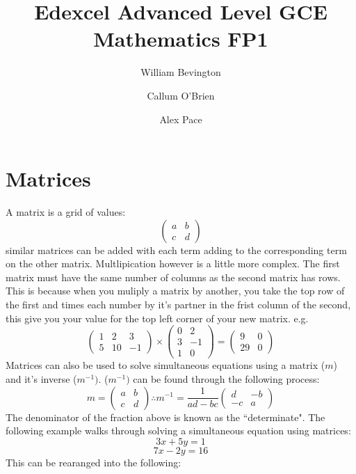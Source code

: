 \documentclass{article}
\title{Edexcel Advanced Level GCE Mathematics FP1}
\author{William Bevington \and Callum O'Brien \and Alex Pace}
\date{}
\begin{document}
\maketitle
\tableofcontents
\newpage

\section{Matrices}
                A matrix is a grid of values:
                \[\left(\begin{array}{cc} a & b \\ c & d \end{array}\right)\]
                similar matrices can be added with each term adding to the corresponding term on the other matrix. Multlipication however is a little more complex. The first matrix must have the same number of columns as the second matrix has rows. This is because when you muliply a matrix by another, you take the top row of the first and times each number by it's partner in the frist column of the second, this give you your value for the top left corner of your new matrix. e.g.
                \[\left(\begin{array}{ccc} 1 & 2 & 3 \\ 5 & 10 & -1 \end{array}\right) \times \left(\begin{array}{cc} 0 & 2 \\ 3 & -1 \\ 1 & 0 \end{array}\right) = \left(\begin{array}{cc} 9 & 0 \\ 29 & 0 \end{array}\right)\]
                Matrices can also be used to solve simultaneous equations using a matrix (\(m\)) and it's inverse (\(m^{-1})\). (\(m^{-1})\) can be found through the following process:
                \[m=\left(\begin{array}{cc} a & b \\ c & d \end{array}\right) \therefore m^{-1} = \frac{1}{ad-bc}\left(\begin{array}{cc} d & -b \\ -c & a \end{array}\right)\]
                The denominator of the fraction above is known as the ``determinate". The following example walks through solving a simultaneous equation using matrices:
                \[3x+5y=1\]
                \[7x-2y=16\]
                This can be rearanged into the following:
\end{document}
